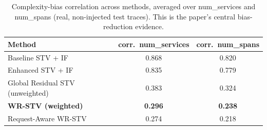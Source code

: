 \begin{table}[t]
\centering
\caption{Complexity-bias correlation across methods, averaged over
num\_services and num\_spans (real, non-injected test traces). This is the
paper's central bias-reduction evidence.}
\label{tab:complexity-bias-all-methods}
\begin{tabular}{lcc}
\toprule
\textbf{Method} & \textbf{corr.\ num\_services} & \textbf{corr.\ num\_spans} \\
\midrule
Baseline STV + IF                 & 0.868 & 0.820 \\
Enhanced STV + IF                 & 0.835 & 0.779 \\
Global Residual STV (unweighted)  & 0.383 & 0.324 \\
\textbf{WR-STV (weighted)}        & \textbf{0.296} & \textbf{0.238} \\
Request-Aware WR-STV              & 0.274 & 0.218 \\
\bottomrule
\end{tabular}
\end{table}
